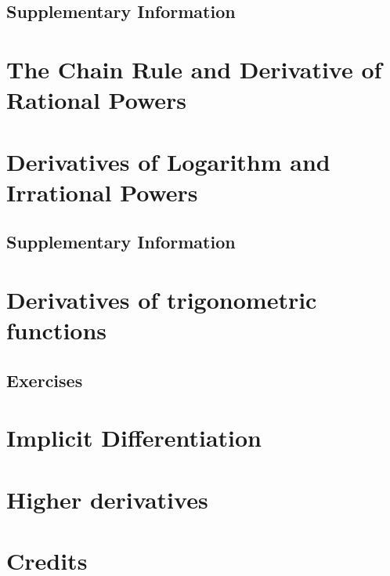 \documentclass{fts_m2}
\begin{document}
    \subsection*{Supplementary Information}
    
    \fi

    \section{The Chain Rule and Derivative of Rational Powers}
    

    \section{Derivatives of Logarithm and Irrational Powers}
    
    \ifcompilesupp
    \subsection*{Supplementary Information}
    
    \fi
    
    \section{Derivatives of trigonometric functions}
    
    \ifcompilesupp
    \subsection*{Exercises}
    
    \fi
    
    \section{Implicit Differentiation}
    

    \section{Higher derivatives}
    

    \appendix

    \section{Credits}
    
\end{document}
